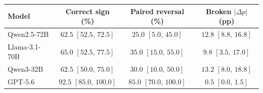 \begin{tabular}{@{}lccc@{}}
\toprule
Model & Correct sign (\%) & Paired reversal (\%) & Broken $|\Delta p|$ (pp) \\
\midrule
Qwen2.5-72B & $62.5$ $[52.5,\,72.5]$ & $25.0$ $[5.0,\,45.0]$ & $12.8$ $[8.8,\,16.8]$ \\
Llama-3.1-70B & $65.0$ $[52.5,\,77.5]$ & $35.0$ $[15.0,\,55.0]$ & $9.8$ $[3.5,\,17.0]$ \\
Qwen3-32B & $62.5$ $[50.0,\,75.0]$ & $30.0$ $[10.0,\,50.0]$ & $13.2$ $[8.0,\,18.8]$ \\
GPT-5.6 & $92.5$ $[85.0,\,100.0]$ & $85.0$ $[70.0,\,100.0]$ & $0.5$ $[0.0,\,1.5]$ \\
\bottomrule
\end{tabular}
